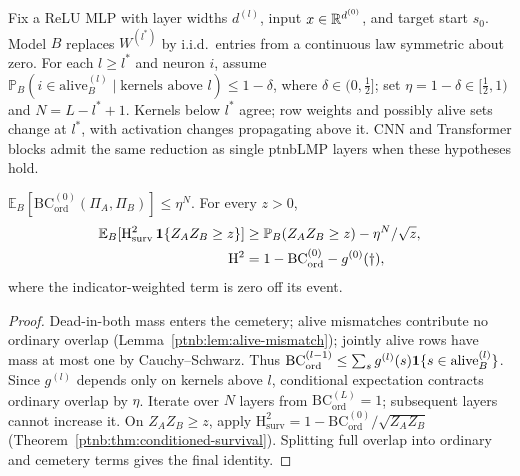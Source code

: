 Fix a ReLU MLP with layer widths $d^{(l)}$, input $x\in\mathbb{R}^{d^{(0)}}$, and target start $s_0$.
Model $B$ replaces $W^{(l^*)}$ by i.i.d.\ entries from a continuous law symmetric about zero.
For each $l\ge l^*$ and neuron $i$, assume
$\mathbb P_B(i\in\mathrm{alive}^{(l)}_B\mid\text{kernels above }l)\le1-\delta$,
where $\delta\in(0,\tfrac12]$; set $\eta=1-\delta\in[\tfrac12,1)$ and $N=L-l^*+1$.
Kernels below $l^*$ agree; row weights and possibly alive sets change at $l^*$,
with activation changes propagating above it. CNN and Transformer blocks admit the same
reduction as single \ac{ptnbLMP} layers when these hypotheses hold.

\begin{theoremenv}\label{ptnb:thm:rand-adf}\label{thm:rand_stopping}
$\mathbb E_B[\mathrm{BC}^{(0)}_{\mathrm{ord}}(\Pi_A,\Pi_B)]\le\eta^N$.
For every $z>0$,
\[
\begin{aligned}
\mathbb E_B[\mathrm H^2_{\mathrm{surv}}\,\mathbf{1}\{Z_AZ_B\ge z\}]
&\ge\mathbb P_B(Z_AZ_B\ge z)-\eta^N/\sqrt z,\\
\mathrm H^2&=1-\mathrm{BC}^{(0)}_{\mathrm{ord}}-g^{(0)}(\dagger),
\end{aligned}
\]
where the indicator-weighted term is zero off its event.
\end{theoremenv}
\begin{proof}
Dead-in-both mass enters the cemetery; alive mismatches contribute no ordinary overlap
(Lemma~\ref{ptnb:lem:alive-mismatch}); jointly alive rows have mass at most one by Cauchy--Schwarz. Thus
$\mathrm{BC}^{(l-1)}_{\mathrm{ord}}\le\sum_s g^{(l)}(s)\mathbf{1}\{s\in\mathrm{alive}^{(l)}_B\}$.
Since $g^{(l)}$ depends only on kernels above $l$, conditional expectation contracts ordinary
overlap by $\eta$. Iterate over $N$ layers from $\mathrm{BC}^{(L)}_{\mathrm{ord}}=1$;
subsequent layers cannot increase it. On $Z_AZ_B\ge z$, apply
$\mathrm H^2_{\mathrm{surv}}=1-\mathrm{BC}^{(0)}_{\mathrm{ord}}/\sqrt{Z_AZ_B}$
(Theorem~\ref{ptnb:thm:conditioned-survival}). Splitting full overlap into ordinary and cemetery terms gives the final identity.
\end{proof}

